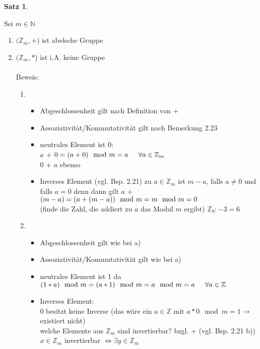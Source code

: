 \documentclass[a4paper,11pt]{article}
\newtheorem{satz}[definition]{Satz}
\begin{document}
\newpage
\begin{satz}
\end{satz}
Sei $m\in\mathbb{N}$
\begin{enumerate}[label=\alph*)]
\item $(\mathbb{Z}_m, $\textcircled{$+$}) ist abelsche Gruppe
\item $(\mathbb{Z}_m, $\textcircled{$*$}) ist i.A. keine Gruppe \\
\\
Beweis:
\begin{enumerate}[label=\alph*)]
\item\begin{itemize}
\item Abgeschlossenheit gilt nach Definition von \textcircled{$+$}
\item Assoziativität/Kommutativität gilt nach Bemerkung 2.23
\item neutrales Element ist 0: \\
$a$ \textcircled{$+$} $0=(a+0)\mod m=a\hspace{5mm}\forall a\in\mathbb{Z}_m$ \\
$0$ \textcircled{$+$} $a$ ebenso 
\item Inverses Element (vgl. Bsp. 2.21) zu $a\in\mathbb{Z}_m$ ist $m-a$, falls $a\neq 0$ und falls $a=0$ denn dann gilt $a$ \textcircled{$+$} $(m-a) = (a+(m-a))\mod m \\
= m\mod m \\
= 0$ \\
(finde die Zahl, die addiert zu $a$ das Modul $m$ ergibt) $\mathbb{Z}_9\colon -3=6$
\end{itemize}
\item\begin{itemize}
\item Abgeschlossenheit gilt wie bei a)
\item Assoziativität/Kommutativität gilt wie bei a)
\item neutrales Element ist 1 da $(1*a)\mod m = (a*1)\mod m \\
=a\mod m=a\hspace{5mm}\forall a\in\mathbb{Z}$
\item Inverses Element: \\
0 besitzt keine Inverse (das wäre ein $a\in\mathbb{Z}$ mit $a*0\mod m =1\rightarrow$ existiert nicht) \\
welche Elemente aus $\mathbb{Z}_m$ sind invertierbar? bzgl. \textcircled{$+$} (vgl. Bsp. 2.21 b)) \\
$x\in\mathbb{Z}_m$ invertierbar $\Leftrightarrow\exists y\in\mathbb{Z}_m$

\end{itemize}
\end{enumerate}
\end{enumerate}
\end{document}
